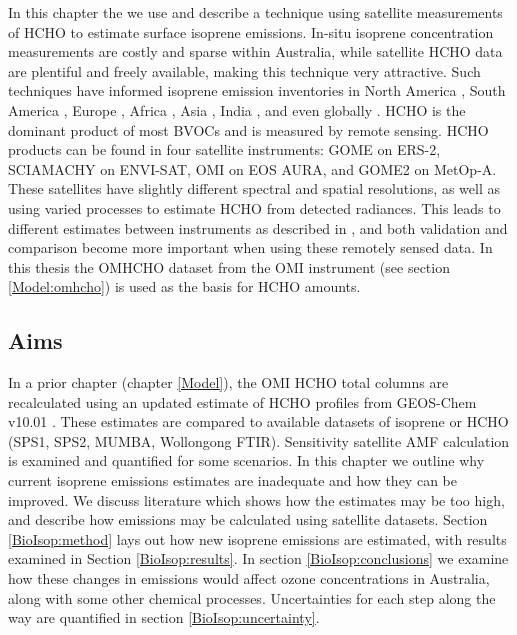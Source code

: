   In this chapter the we use and describe a technique using satellite measurements of HCHO to estimate surface isoprene emissions.
  In-situ isoprene concentration measurements are costly and sparse within Australia, while satellite HCHO data are plentiful and freely available, making this technique very attractive.
  Such techniques have informed isoprene emission inventories in North America \parencite{Abbot2003,Palmer2003,Palmer2006,Millet2006,Millet2008}, South America \parencite{Barkley2013}, Europe \parencite{Dufour2009,Curci2010}, Africa \parencite{Marais2012}, Asia \parencite{Fu2007,Stavrakou2014}, India \parencite{Surl2018}, and even globally \parencite{Shim2005,FortemsCheiney2012,Bauwens2016}.
  HCHO is the dominant product of most BVOCs and is measured by remote sensing.
  HCHO products can be found in four satellite instruments: GOME on ERS-2, SCIAMACHY on ENVI-SAT, OMI on EOS AURA, and GOME2 on MetOp-A.
  These satellites have slightly different spectral and spatial resolutions, as well as using varied processes to estimate HCHO from detected radiances.
  This leads to different estimates between instruments as described in \textcite{Lorente2017}, and both validation and comparison become more important when using these remotely sensed data.
  In this thesis the OMHCHO dataset from the OMI instrument (see section \ref{Model:omhcho}) is used as the basis for HCHO amounts.
  
  
  \subsection{Aims}
    
    In a prior chapter (chapter \ref{Model}), the OMI HCHO total columns are recalculated using an updated estimate of HCHO profiles from GEOS-Chem v10.01 .
    These estimates are compared to available datasets of isoprene or HCHO (SPS1, SPS2, MUMBA, Wollongong FTIR). %
    Sensitivity satellite AMF calculation is examined and quantified for some scenarios.
    In this chapter we outline why current isoprene emissions estimates are inadequate and how they can be improved.
    We discuss literature which shows how the estimates may be too high, and describe how emissions may be calculated using satellite datasets.
    Section \ref{BioIsop:method} lays out how new isoprene emissions are estimated, with results examined in Section \ref{BioIsop:results}. 
    In section \ref{BioIsop:conclusions} we examine how these changes in emissions would affect ozone concentrations in Australia, along with some other chemical processes.
    Uncertainties for each step along the way are quantified in section \ref{BioIsop:uncertainty}.
    
